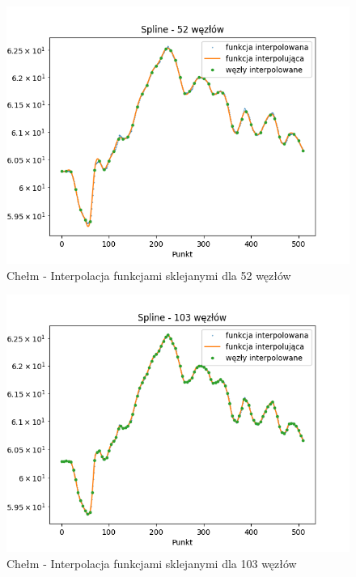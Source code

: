 \documentclass[12pt]{extarticle}
\begin{document}
\begin{figure}[H]
    \centering
    \includegraphics[scale=0.8]{interpolation_chelm_Spline_52.png}
    \caption{Chełm - Interpolacja funkcjami sklejanymi dla 52 węzłów}
\end{figure}
\begin{figure}[H]
    \centering
    \includegraphics[scale=0.8]{interpolation_chelm_Spline_103.png}
    \caption{Chełm - Interpolacja funkcjami sklejanymi dla 103 węzłów}
\end{figure}
\newpage
\end{document}
